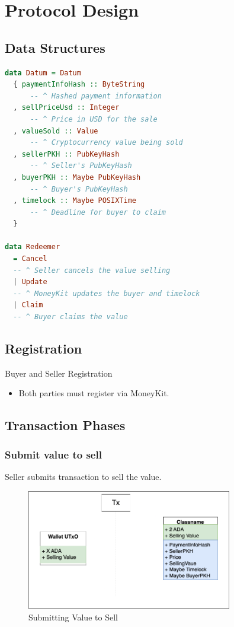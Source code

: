 \documentclass[11pt,oneside,a4paper]{article}
\begin{document}
\section{Protocol Design}

\subsection{Data Structures}

\begin{lstlisting}[language=Haskell]
data Datum = Datum
  { paymentInfoHash :: ByteString
      -- ^ Hashed payment information
  , sellPriceUsd :: Integer
      -- ^ Price in USD for the sale
  , valueSold :: Value
      -- ^ Cryptocurrency value being sold
  , sellerPKH :: PubKeyHash
      -- ^ Seller's PubKeyHash
  , buyerPKH :: Maybe PubKeyHash
      -- ^ Buyer's PubKeyHash
  , timelock :: Maybe POSIXTime
      -- ^ Deadline for buyer to claim
  }

data Redeemer
  = Cancel
  -- ^ Seller cancels the value selling
  | Update
  -- ^ MoneyKit updates the buyer and timelock
  | Claim
  -- ^ Buyer claims the value
\end{lstlisting}

\subsection{Registration}
Buyer and Seller Registration
\begin{itemize}
  \item Both parties must register via MoneyKit.

\end{itemize}

\subsection{Transaction Phases}

\subsubsection{Submit value to sell}
Seller submits transaction to sell the value.
\begin{figure}[H]
  \centering
  \includegraphics[width=0.8\textwidth]{img/submit_sell_value.png}
  \caption{Submitting Value to Sell}
  \label{fig:submit_sell_value}
\end{figure}
\end{document}
